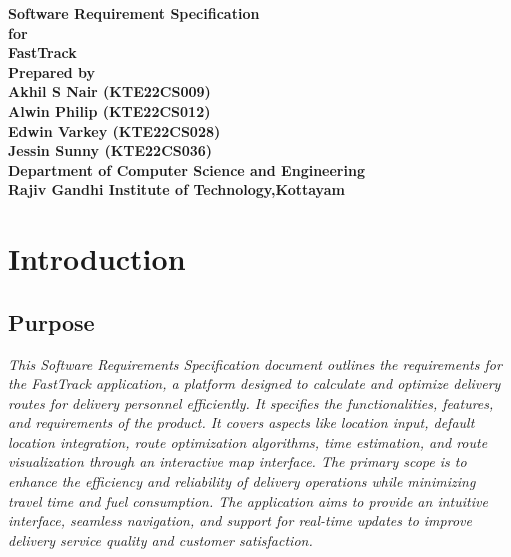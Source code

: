 \documentclass{article}
\begin{document}
\begin{center}
\textbf{\Huge Software Requirement Specification}\\
\vspace{70pt}
\textbf{\Large for}\\
\vspace{60pt}
\textbf{\LARGE FastTrack}\\
\vspace{40pt}
\textbf{\large Prepared by}\\
\vspace{30pt}
\textbf{\Large Akhil S Nair (KTE22CS009)}\\
\vspace{30pt}
\textbf{\Large Alwin Philip (KTE22CS012)}\\
\vspace{30pt}
\textbf{\Large Edwin Varkey (KTE22CS028)}\\
\vspace{30pt}
\textbf{\Large Jessin Sunny (KTE22CS036)}\\
\vspace{70pt}
\textbf{Department of Computer Science and Engineering}\\
\vspace{20pt}
\textbf{Rajiv Gandhi Institute of Technology,Kottayam}
\end{center}
\newpage
\tableofcontents
\newpage
\section{Introduction}
\subsection{Purpose}
\emph{This Software Requirements Specification document outlines the requirements for the FastTrack application, a platform designed to calculate and optimize delivery routes for delivery personnel efficiently. It specifies the functionalities, features, and requirements of the product. It covers aspects like location input, default location integration, route optimization algorithms, time estimation, and route visualization through an interactive map interface.  
The primary scope is to enhance the efficiency and reliability of delivery operations while minimizing travel time and fuel consumption. The application aims to provide an intuitive interface, seamless navigation, and support for real-time updates to improve delivery service quality and customer satisfaction.}
\end{document}
